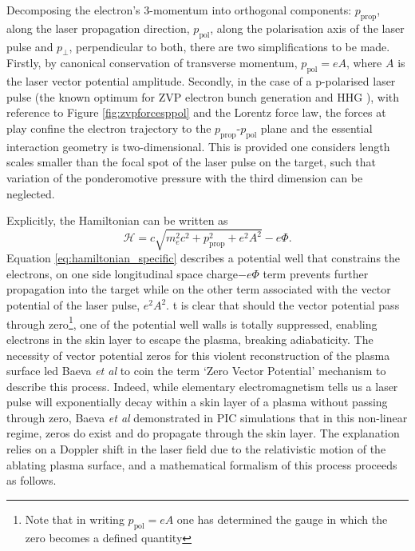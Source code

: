 Decomposing the electron's 3-momentum into orthogonal components: $p_\mathrm{prop}$, along the laser propagation direction, $p_\mathrm{pol}$, along the polarisation axis of the laser pulse and $p_\perp$, perpendicular to both, there are two simplifications to be made. Firstly, by canonical conservation of transverse momentum, $p_\mathrm{pol} = eA$, where $A$ is the laser vector potential amplitude. Secondly, in the case of a p-polarised laser pulse (the known optimum for ZVP electron bunch generation \cite{savinAttosecondscaleAbsorptionExtreme2017} and \ac{HHG} \cite{baevaTheoryHighorderHarmonic2006}), with reference to Figure \ref{fig:zvpforcesppol} and the Lorentz force law, the forces at play confine the electron trajectory to the $p_\mathrm{prop}$-$p_\mathrm{pol}$ plane and the essential interaction geometry is two-dimensional. This is provided one considers length scales smaller than the focal spot of the laser pulse on the target, such that variation of the ponderomotive pressure with the third dimension can be neglected.

Explicitly, the Hamiltonian can be written as
\begin{equation}\label{eq:hamiltonian_specific}
	\mathcal{H} = c\sqrt{m^2_ec^2 + p^2_\mathrm{prop} + e^2A^2} - e\Phi.
\end{equation}
Equation \ref{eq:hamiltonian_specific} describes a potential well that constrains the electrons, on one side longitudinal space charge$- e\Phi$ term prevents further propagation into the target while on the other term associated with the vector potential of the laser pulse, $ e^2A^2$. t is clear that should the vector potential pass through zero\footnote{Note that in writing $p_\mathrm{pol} = eA$ one has determined the gauge in which the zero becomes a defined quantity}, one of the potential well walls is totally suppressed, enabling electrons in the skin layer to escape the plasma, breaking adiabaticity. The necessity of vector potential zeros for this violent reconstruction of the plasma surface led Baeva \textit{et al} \cite{baevaZeroVectorPotential2011} to coin the term `Zero Vector Potential' mechanism to describe this process. Indeed, while elementary electromagnetism tells us a laser pulse will exponentially decay within a skin layer of a plasma without passing through zero, Baeva \textit{et al} \cite{baevaZeroVectorPotential2011} demonstrated in \ac{PIC} simulations that in this non-linear regime, zeros do exist and do propagate through the skin layer. The explanation relies on a Doppler shift in the laser field due to the relativistic motion of the ablating plasma surface, and a mathematical formalism of this process proceeds as follows.

